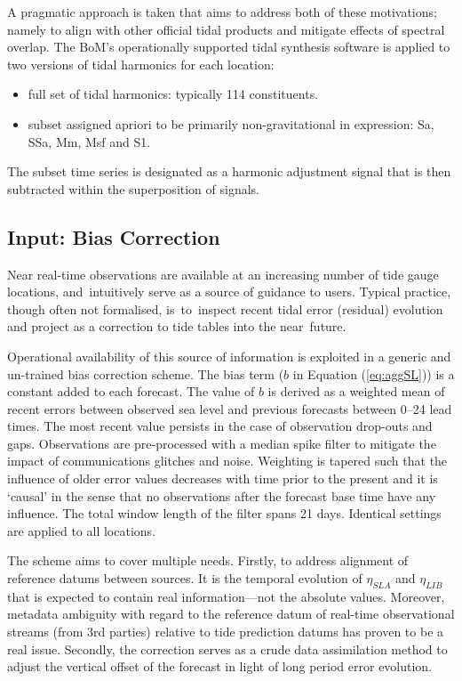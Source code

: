 \documentclass[jmse,article,accept,moreauthors,pdftex,10pt,a4paper]{mdpi}
\begin{document}
A pragmatic approach is taken that aims to address both of these motivations; namely to align with other official tidal products and mitigate effects of spectral overlap.
The BoM's operationally supported tidal synthesis software is applied to two versions of tidal harmonics for each location:
\begin{itemize}[leftmargin=*]%
  \item full set of tidal harmonics: typically 114 constituents.
  \item subset assigned apriori to be primarily non-gravitational in expression: Sa, SSa, Mm, Msf and S1.
\end{itemize}

The subset time series is designated as a harmonic adjustment signal that is then subtracted within the superposition of signals. 


\subsection{Input: Bias Correction}
\label{sec:bias}
Near real-time observations are available at an increasing number of tide gauge locations, and~intuitively serve as a source of guidance to users.
Typical practice, though often not formalised, is~to~inspect recent tidal error (residual) evolution and project as a correction to tide tables into the near~future.

Operational availability of this source of information is exploited in a generic and un-trained bias correction scheme. 
The bias term ($b$ in Equation (\ref{eq:aggSL})) is a constant added to each forecast.
The value of $b$ is derived as a weighted mean of recent errors between observed sea level and previous forecasts between 0--24 lead times.
The most recent value persists in the case of observation drop-outs and gaps.
Observations are pre-processed with a median spike filter to mitigate the impact of communications glitches and noise.
Weighting is tapered such that the influence of older error values decreases with time prior to the present and it is `causal' in the sense that no observations after the forecast base time have any influence.
The total window length of the filter spans 21 days.
Identical settings are applied to all locations.


The scheme aims to cover multiple needs.
Firstly, to address alignment of reference datums between sources. 
It is the temporal evolution of $\eta_{SLA}$ and $\eta_{LIB}$ that is expected to contain real information---not the absolute values.
Moreover, metadata ambiguity with regard to the reference datum of real-time observational streams (from 3rd parties) relative to tide prediction datums has proven to be a real issue.
Secondly, the correction serves as a crude data assimilation method to adjust the vertical offset of the forecast in light of long period error evolution. 
\end{document}

